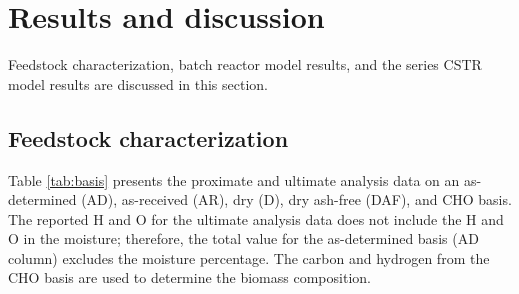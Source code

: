
\section{Results and discussion}

Feedstock characterization, batch reactor model results, and the series CSTR model results are discussed in this section.

\subsection{Feedstock characterization}

Table \ref{tab:basis} presents the proximate and ultimate analysis data on an as-determined (AD), as-received (AR), dry (D), dry ash-free (DAF), and CHO basis. The reported H and O for the ultimate analysis data does not include the H and O in the moisture; therefore, the total value for the as-determined basis (AD column) excludes the moisture percentage. The carbon and hydrogen from the CHO basis are used to determine the biomass composition.

